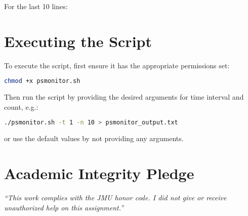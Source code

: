 \documentclass{article}
\begin{document}
For the last 10 lines:


\section{Executing the Script}
To execute the script, first ensure it has the appropriate permissions set:
\begin{lstlisting}[language=bash]
chmod +x psmonitor.sh
\end{lstlisting}
Then run the script by providing the desired arguments for time interval and count, e.g.:
\begin{lstlisting}[language=bash]
./psmonitor.sh -t 1 -n 10 > psmonitor_output.txt
\end{lstlisting}
 or use the default values by not providing any arguments.
 
 \vfill
  \section*{Academic Integrity Pledge}
    {\color{red}\textit{“This work complies with the JMU honor code. I did not give or receive unauthorized help on this assignment.”}}
\end{document}
